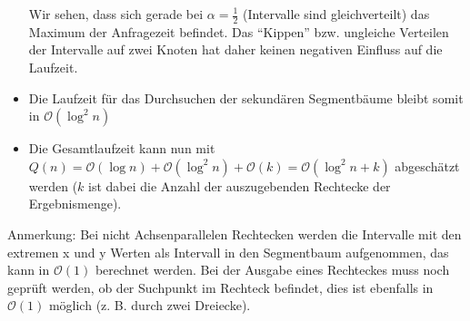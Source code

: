 \documentclass[a4paper]{article}
\begin{document}
\begin{itemize}
	Wir sehen, dass sich gerade bei $\alpha = \frac{1}{2}$ (Intervalle sind gleichverteilt) das Maximum der Anfragezeit befindet. 
Das "`Kippen"' bzw. ungleiche Verteilen der Intervalle auf zwei Knoten hat daher keinen negativen
Einfluss auf die Laufzeit. 

	\item Die Laufzeit für das Durchsuchen der sekundären Segmentbäume bleibt somit in 
	 $\mathcal{O}(\log^2 n)$
	
\item Die Gesamtlaufzeit kann nun mit $Q(n) = \mathcal{O}(\log n) + \mathcal{O}(\log^2 n) + \mathcal{O}(k)
= \mathcal{O}(\log^2 n + k)$ abgeschätzt werden ($k$ ist dabei die Anzahl der auszugebenden Rechtecke
der Ergebnismenge).
\end{itemize}

Anmerkung: Bei nicht Achsenparallelen Rechtecken werden die Intervalle mit den extremen x und y Werten als Intervall in den Segmentbaum aufgenommen, das kann in $\mathcal{O}(1)$ berechnet werden. Bei der Ausgabe eines Rechteckes muss noch geprüft werden, ob der Suchpunkt im Rechteck befindet, dies ist ebenfalls in $\mathcal{O}(1)$ möglich (z. B. durch zwei Dreiecke).
\end{document}
